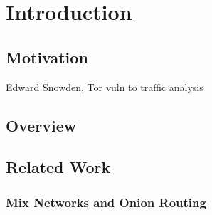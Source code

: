 \documentclass[final,dissertation.tex]{subfiles}
\begin{document}
\chapter{Introduction}

\section{Motivation}

Edward Snowden, Tor vuln to traffic analysis

\section{Overview}

\section{Related Work}

\subsection{Mix Networks and Onion Routing}
\end{document}
